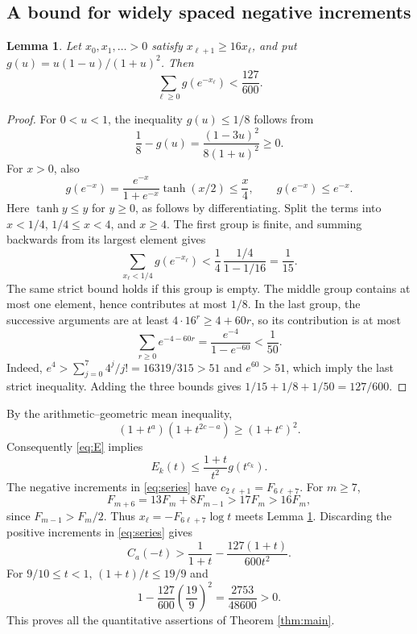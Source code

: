\documentclass[11pt]{article}
\newtheorem{lemma}{Lemma}
\begin{document}
\subsection*{A bound for widely spaced negative increments}
\begin{lemma}\label{lem:spacing}
Let $x_0,x_1,\ldots>0$ satisfy $x_{\ell+1}\geq16x_\ell$, and put
$g(u)=u(1-u)/(1+u)^2$. Then
\[
 \sum_{\ell\geq0}g(e^{-x_\ell})<\frac{127}{600}.
\]
\end{lemma}
\begin{proof}
For $0<u<1$, the inequality $g(u)\leq1/8$ follows from
\[
 \frac18-g(u)=\frac{(1-3u)^2}{8(1+u)^2}\geq0.
\]
For $x>0$, also
\[
 g(e^{-x})=
 \frac{e^{-x}}{1+e^{-x}}\tanh(x/2)\leq\frac{x}{4},
 \qquad
 g(e^{-x})\leq e^{-x}.
\]
Here $\tanh y\leq y$ for $y\geq0$, as follows by differentiating.
Split the terms into $x<1/4$, $1/4\leq x<4$, and $x\geq4$.
The first group is finite, and summing backwards from its largest
element gives
\[
 \sum_{x_\ell<1/4}g(e^{-x_\ell})
 <\frac14\,\frac{1/4}{1-1/16}=\frac1{15}.
\]
The same strict bound holds if this group is empty.
The middle group contains at most one element, hence contributes
at most $1/8$. In the last group, the successive arguments are at
least $4\cdot16^r\geq4+60r$, so its contribution is at most
\[
 \sum_{r\geq0}e^{-4-60r}=\frac{e^{-4}}{1-e^{-60}}<\frac1{50}.
\]
Indeed, $e^4>\sum_{j=0}^7 4^j/j!=16319/315>51$ and $e^{60}>51$,
which imply the last strict inequality. Adding the three bounds gives
$1/15+1/8+1/50=127/600$.
\end{proof}

By the arithmetic--geometric mean inequality,
\[
 (1+t^a)(1+t^{2c-a})\geq(1+t^c)^2.
\]
Consequently \eqref{eq:E} implies
\begin{equation}\label{eq:majorant}
 E_k(t)\leq\frac{1+t}{t^2}g(t^{c_k}).
\end{equation}
The negative increments in \eqref{eq:series} have
$c_{2\ell+1}=F_{6\ell+7}$. For $m\geq7$,
\[
 F_{m+6}=13F_m+8F_{m-1}>17F_m>16F_m,
\]
since $F_{m-1}>F_m/2$. Thus
$x_\ell=-F_{6\ell+7}\log t$ meets Lemma \ref{lem:spacing}.
Discarding the positive increments in \eqref{eq:series} gives
\begin{equation}\label{eq:lower}
 C_a(-t)>
 \frac1{1+t}-\frac{127(1+t)}{600t^2}.
\end{equation}
For $9/10\leq t<1$, $(1+t)/t\leq19/9$ and
\[
 1-\frac{127}{600}\left(\frac{19}{9}\right)^2
 =\frac{2753}{48600}>0.
\]
This proves all the quantitative assertions of Theorem \ref{thm:main}.
\end{document}
